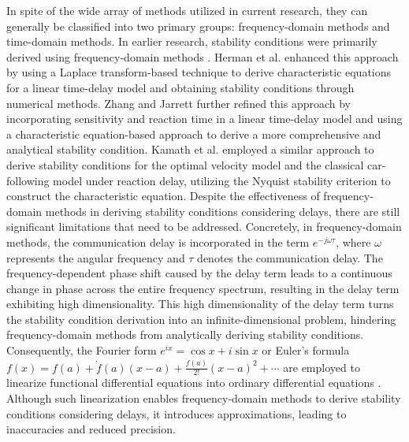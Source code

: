 \documentclass[a4paper]{cas-sc}
\begin{document}
In spite of the wide array of methods utilized in current research, they can generally be classified into two primary groups: frequency-domain methods and time-domain methods. In earlier research, stability conditions were primarily derived using frequency-domain methods \citep{chandler1958traffic,Li2019yongfu}. Herman et al. \citep{herman1959traffic, gazis1963analytical} enhanced this approach by using a Laplace transform-based technique to derive characteristic equations for a linear time-delay model and obtaining stability conditions through numerical methods. Zhang and Jarrett \citep{zhang1997stability, jarrett1993dynamic} further refined this approach by incorporating sensitivity and reaction time in a linear time-delay model and using a characteristic equation-based approach to derive a more comprehensive and analytical stability condition. Kamath et al. \citep{kamath2015car} employed a similar approach to derive stability conditions for the optimal velocity model and the classical car-following model under reaction delay, utilizing the Nyquist stability criterion to construct the characteristic equation. Despite the effectiveness of frequency-domain methods in deriving stability conditions considering delays, there are still significant limitations that need to be addressed. Concretely, in frequency-domain methods, the communication delay is incorporated in the term $e^{-j\omega\tau}$, where $\omega$ represents the angular frequency and $\tau$ denotes the communication delay. The frequency-dependent phase shift caused by the delay term leads to a continuous change in phase across the entire frequency spectrum, resulting in the delay term exhibiting high dimensionality. This high dimensionality of the delay term turns the stability condition derivation into an infinite-dimensional problem, hindering frequency-domain methods from analytically deriving stability conditions. Consequently, the Fourier form $e^{ix} =\cos{x}+ i \sin{x}$ or Euler's formula $f(x)=f(a)+\dot f(a)(x-a)+\frac{\ddot f(a)}{2!}(x-a)^2+\cdots$ are employed to linearize functional differential equations into ordinary differential equations \citep{lhachemi2020feedback}. Although such linearization enables frequency-domain methods to derive stability conditions considering delays, it introduces approximations, leading to inaccuracies and reduced precision.
\end{document}
